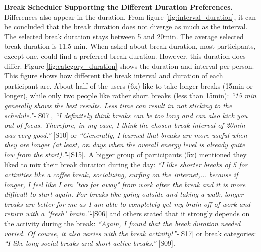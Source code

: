 \documentclass{hasel_thesis}
\begin{document}
\textbf{Break Scheduler Supporting the Different Duration Preferences.}
Differences also appear in the duration. From figure \ref{fig:interval_duration}, it can be concluded that the break duration does not diverge as much as the interval. The selected break duration stays between 5 and 20min. The average selected break duration is 11.5 min. When asked about break duration, most participants, except one, could find a preferred break duration. However, this duration does differ. Figure \ref{fig:category_duration} shows the duration and interval per person. This figure shows how different the break interval and duration of each participant are. About half of the users (6x) like to take longer breaks (15min or longer), while only two people like rather short breaks (less than 15min): \textit{“15 min generally shows the best results. Less time can result in not sticking to the schedule.”}-[S07], \textit{“I definitely think breaks can be too long and can also kick you out of focus. Therefore, in my case, I think the chosen break interval of 20min was very good.”}-[S10] or \textit{“Generally, I learned that breaks are more useful when they are longer (at least, on days when the overall energy level is already quite low from the start).”}-[S15]. A bigger group of participants (5x) mentioned they liked to mix their break duration during the day: \textit{“I like shorter breaks of 5 for activities like a coffee break, socializing, surfing on the internet,... because if longer, I feel like I am "too far away" from work after the break and it is more difficult to start again. For breaks like going outside and taking a walk, longer breaks are better for me as I am able to completely get my brain off of work and return with a "fresh" brain.”}-[S06] and others stated that it strongly depends on the activity during the break: \textit{ “Again, I found that the break duration needed varied. Of course, it also varies with the break activity!”}-[S17] or break categories: \textit{“I like long social breaks and short active breaks.”}-[S09]. 
\end{document}
